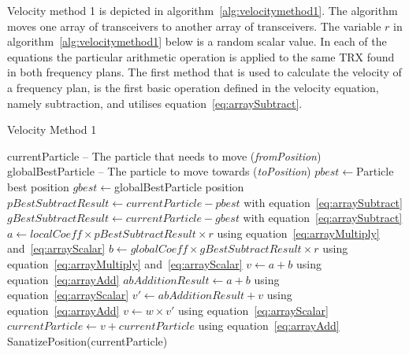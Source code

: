 Velocity method 1 is depicted in algorithm~\ref{alg:velocitymethod1}. The algorithm moves one array of transceivers to another array of transceivers. The variable $r$ in algorithm~\ref{alg:velocitymethod1} below is a random scalar value. In each of the equations the particular arithmetic operation is applied to the same TRX found in both frequency plans. The first method that is used to calculate the velocity of a frequency plan, is the first basic operation defined in the velocity equation, namely subtraction, and utilises equation~\ref{eq:arraySubtract}.
\begin{algorithm}[H]
\caption{Velocity Method 1}
\label{alg:velocitymethod1}
	\begin{algorithmic}[1]
        \Require currentParticle -- The particle that needs to move (\emph{fromPosition})
        \Require globalBestParticle -- The particle to move towards (\emph{toPosition})
	\State $pbest \leftarrow $Particle best position
	\State $gbest \leftarrow $globalBestParticle position
	\State $pBestSubtractResult \leftarrow currentParticle - pbest$ with equation~\ref{eq:arraySubtract}
	\State $gBestSubtractResult \leftarrow currentParticle - gbest$  with equation~\ref{eq:arraySubtract}
    \State $a \leftarrow localCoeff \times pBestSubtractResult \times r$ using equation~\ref{eq:arrayMultiply} and~\ref{eq:arrayScalar}
    \State $b \leftarrow globalCoeff \times gBestSubtractResult \times r$  using equation~\ref{eq:arrayMultiply} and~\ref{eq:arrayScalar}
		\State $v \leftarrow a + b$ using equation~\ref{eq:arrayAdd}
	\Else
		\State $abAdditionResult \leftarrow a + b$ using equation~\ref{eq:arrayScalar}
		\State $v' \leftarrow abAdditionResult + v$ using equation~\ref{eq:arrayAdd}
		\State $v \leftarrow w \times v'$ using equation~\ref{eq:arrayScalar}
	\EndIf
	\State $currentParticle \leftarrow v + currentParticle$ using equation~\ref{eq:arrayAdd}
	\State SanatizePosition(currentParticle)
	\end{algorithmic}
\end{algorithm}

